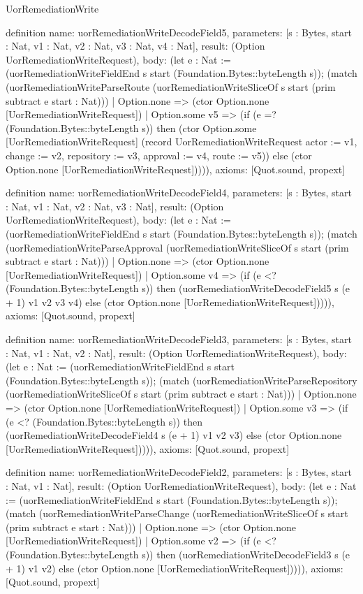\begin{lexlean}{UorRemediationWrite}
\begin{semanticmodule}
definition{
  name: uorRemediationWriteDecodeField5,
  parameters: [s : Bytes, start : Nat, v1 : Nat, v2 : Nat, v3 : Nat, v4 : Nat],
  result: (Option UorRemediationWriteRequest),
  body: (let e : Nat := (uorRemediationWriteFieldEnd s start (Foundation.Bytes::byteLength s)); (match (uorRemediationWriteParseRoute (uorRemediationWriteSliceOf s start (prim subtract e start : Nat)))
    | Option.none => (ctor Option.none [UorRemediationWriteRequest])
    | Option.some v5 => (if (e =? (Foundation.Bytes::byteLength s)) then (ctor Option.some [UorRemediationWriteRequest] (record UorRemediationWriteRequest {actor := v1, change := v2, repository := v3, approval := v4, route := v5})) else (ctor Option.none [UorRemediationWriteRequest])))),
  axioms: [Quot.sound, propext]
}

definition{
  name: uorRemediationWriteDecodeField4,
  parameters: [s : Bytes, start : Nat, v1 : Nat, v2 : Nat, v3 : Nat],
  result: (Option UorRemediationWriteRequest),
  body: (let e : Nat := (uorRemediationWriteFieldEnd s start (Foundation.Bytes::byteLength s)); (match (uorRemediationWriteParseApproval (uorRemediationWriteSliceOf s start (prim subtract e start : Nat)))
    | Option.none => (ctor Option.none [UorRemediationWriteRequest])
    | Option.some v4 => (if (e <? (Foundation.Bytes::byteLength s)) then (uorRemediationWriteDecodeField5 s (e + 1) v1 v2 v3 v4) else (ctor Option.none [UorRemediationWriteRequest])))),
  axioms: [Quot.sound, propext]
}

definition{
  name: uorRemediationWriteDecodeField3,
  parameters: [s : Bytes, start : Nat, v1 : Nat, v2 : Nat],
  result: (Option UorRemediationWriteRequest),
  body: (let e : Nat := (uorRemediationWriteFieldEnd s start (Foundation.Bytes::byteLength s)); (match (uorRemediationWriteParseRepository (uorRemediationWriteSliceOf s start (prim subtract e start : Nat)))
    | Option.none => (ctor Option.none [UorRemediationWriteRequest])
    | Option.some v3 => (if (e <? (Foundation.Bytes::byteLength s)) then (uorRemediationWriteDecodeField4 s (e + 1) v1 v2 v3) else (ctor Option.none [UorRemediationWriteRequest])))),
  axioms: [Quot.sound, propext]
}

definition{
  name: uorRemediationWriteDecodeField2,
  parameters: [s : Bytes, start : Nat, v1 : Nat],
  result: (Option UorRemediationWriteRequest),
  body: (let e : Nat := (uorRemediationWriteFieldEnd s start (Foundation.Bytes::byteLength s)); (match (uorRemediationWriteParseChange (uorRemediationWriteSliceOf s start (prim subtract e start : Nat)))
    | Option.none => (ctor Option.none [UorRemediationWriteRequest])
    | Option.some v2 => (if (e <? (Foundation.Bytes::byteLength s)) then (uorRemediationWriteDecodeField3 s (e + 1) v1 v2) else (ctor Option.none [UorRemediationWriteRequest])))),
  axioms: [Quot.sound, propext]
}


\end{semanticmodule}
\end{lexlean}

